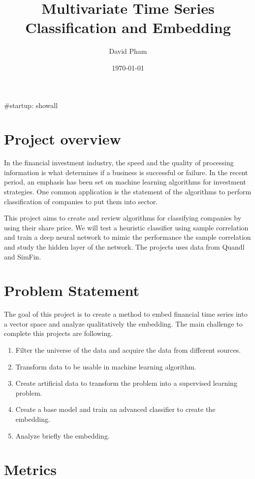 \documentclass[a4paper,twoside]{article}
\author{David Pham}
\date{\today}
\title{Multivariate Time Series Classification and Embedding}
\begin{document}
\maketitle
\tableofcontents

\#startup: showall

\section{Project overview}
\label{sec:orgb64b546}

In the financial investment industry, the speed and the quality of processing
information is what determines if a business is successful or failure. In the
recent period, an emphasis has been set on machine learning algorithms for
investment strategies. One common application is the statement of the algorithms
to perform classification of companies to put them into sector.

This project aims to create and review algorithms for classifying companies by
using their share price. We will test a heuristic classifier using sample
correlation and train a deep neural network to mimic the performance the sample
correlation and study the hidden layer of the network. The projects uses data
from Quandl and SimFin.

\section{Problem Statement}
\label{sec:orge03247f}

The goal of this project is to create a method to embed financial time series
into a vector space and analyze qualitatively the embedding. The main
challenge to complete this projects are following.

\begin{enumerate}
\item Filter the universe of the data and acquire the data from different
sources.
\item Transform data to be usable in machine learning algorithm.
\item Create artificial data to transform the problem into a supervised learning problem.
\item Create a base model and train an advanced classifier to create the embedding.
\item Analyze briefly the embedding.
\end{enumerate}


\section{Metrics}
\label{sec:orga864785}
\end{document}

